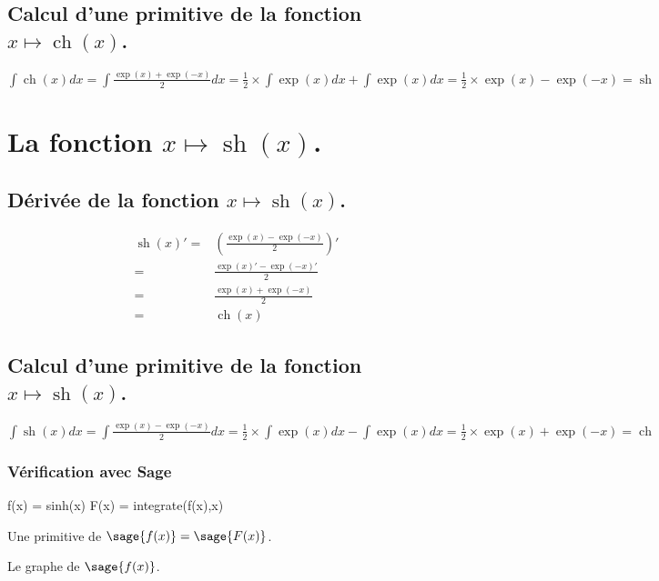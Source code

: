 \documentclass[a4paper,14pt]{extreport} %
\renewcommand{\sinh}{\mathop{\mathrm{sh}}}
\renewcommand{\cosh}{\mathop{\mathrm{ch}}}
\begin{document}
\subsection{Calcul d'une primitive de la fonction  $x \mapsto \cosh(x)$.}

$\int \cosh(x) dx = \int \frac{\exp(x)+ \exp(-x)}{2} dx = \frac{1}{2} \times \int \exp(x) dx + \int \exp(x) dx = \frac{1}{2} \times \exp(x) - \exp(-x) = \sinh$
\\


\section{La fonction  $x \mapsto \sinh(x)$.}


\subsection{Dérivée de la fonction $x \mapsto \sinh(x)$.}

\begin{align*}
\sinh(x)' =& \left( \frac{\exp(x)-\exp(-x)}{2} \right)' \\ =& \frac{\exp(x)'-\exp(-x)'}{2} \\=& \frac{\exp(x)+\exp(-x)}{2} \\=& \cosh(x)
\end{align*}





\subsection{Calcul d'une primitive de la fonction  $x \mapsto \sinh(x)$.}


$\int \sinh(x) dx = \int \frac{\exp(x)- \exp(-x)}{2} dx = \frac{1}{2} \times \int \exp(x) dx - \int \exp(x) dx = \frac{1}{2} \times \exp(x) + \exp(-x) = \cosh$


\subsubsection{Vérification avec Sage}

\begin{sageblock}
    f(x) = sinh(x)
    F(x) = integrate(f(x),x)
\end{sageblock}


Une primitive de $\sage{f(x)} = \sage{F(x)} $.

Le graphe de $\sage{f(x)} $.


\begin{center}
 \\
\end{center}
\end{document}
